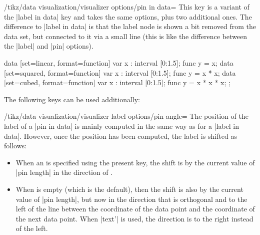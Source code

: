 \begin{key}{/tikz/data visualization/visualizer options/pin in data=}
    This key is a variant of the |label in data| key and takes the same
    options, plus two additional ones. The difference to |label in data| is
    that the label node is shown a bit removed from the data set, but connected
    to it via a small line (this is like the difference between the |label| and
    |pin| options).
\begin{codeexample}[
    width=6.3cm,
    preamble={\usetikzlibrary{datavisualization.formats.functions}},
]
\tikz \datavisualization [
  scientific axes=clean,
  visualize as smooth line/.list={linear, squared, cubed},
  linear ={pin in data={text=$2x$}},
  squared={pin in data={text=$x^2$}},
  cubed  ={pin in data={text=$x^3$}}]
data [set=linear, format=function] {
  var x : interval [0:1.5];
  func y = \value x;
}
data [set=squared, format=function] {
  var x : interval [0:1.5];
  func y = \value x * \value x;
}
data [set=cubed, format=function] {
  var x : interval [0:1.5];
  func y = \value x * \value x * \value x;
};
\end{codeexample}
    The following keys can be used additionally:
    \begin{key}{/tikz/data visualization/visualizer label options/pin angle=}
        The position of the label of a |pin in data| is mainly computed in the
        same way as for a |label in data|. However, once the position has been
        computed, the label is shifted as follows:
        \begin{itemize}
            \item When an  is specified using the present key, the
                shift is by the current value of |pin length| in the direction
                of .
            \item When  is empty (which is the default), then the
                shift is also by the current value of |pin length|, but now in
                the direction that is orthogonal and to the left of the line
                between the coordinate of the data point and the coordinate of
                the next data point. When |text'| is used, the direction is to
                the right instead of the left.
        \end{itemize}
    \end{key}


\end{key}
